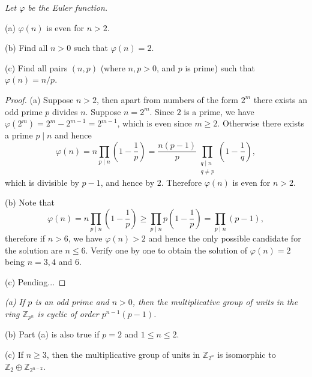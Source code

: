 \begin{problem}\em
Let $\varphi$ be the Euler function.\par
(a) $\varphi(n)$ is even for $n>2$.\par
(b) Find all $n>0$ such that $\varphi(n)=2$.\par
(c) Find all pairs $(n, p)$ (where $n, p>0$, and $p$ is prime) such that $\varphi(n)=n/p$.
\end{problem}
\begin{proof}
(a) Suppose $n>2$, then apart from numbers of the form $2^m$ there exists an odd prime $p$ divides $n$. Suppose $n=2^m$. Since $2$ is a prime, we have $\varphi(2^m)=2^m-2^{m-1}=2^{m-1}$, which is even since $m\ge 2$. Otherwise there exists a prime $p\mid n$ and hence 
$$
\varphi \left( n \right) =n\prod_{p\mid n}{\left( 1-\frac{1}{p} \right)}=\frac{n\left( p-1 \right)}{p}\prod_{\substack{q\mid n \\ q\ne p}}\left( 1-\frac{1}{q} \right),
$$
which is divisible by $p-1$, and hence by $2$. Therefore $\varphi(n)$ is even for $n>2$.\par
(b) Note that 
$$
\varphi \left( n \right) =n\prod_{p\mid n}{\left( 1-\frac{1}{p} \right)}\ge \prod_{p\mid n}{p\left( 1-\frac{1}{p} \right)}=\prod_{p\mid n}{\left( p-1 \right)},
$$
therefore if $n>6$, we have $\varphi(n)>2$ and hence the only possible candidate for the solution are $n\le 6$. Verify one by one to obtain the solution of $\varphi(n)=2$ being $n=3,4$ and $6$.\par
(c) Pending...
\end{proof}
\begin{problem}\em
(a) If $p$ is an odd prime and $n>0$, then the multiplicative group of units in the ring $\mathbb{Z}_{p^n}$ is cyclic of order $p^{n-1}(p-1)$.\par
(b) Part (a) is also true if $p=2$ and $1\leq n\leq 2$.\par
(c) If $n\geq 3$, then the multiplicative group of units in $\mathbb{Z}_{2^n}$ is isomorphic to $\mathbb{Z}_2\oplus \mathbb{Z}_{2^{n-2}}$.
\end{problem}
